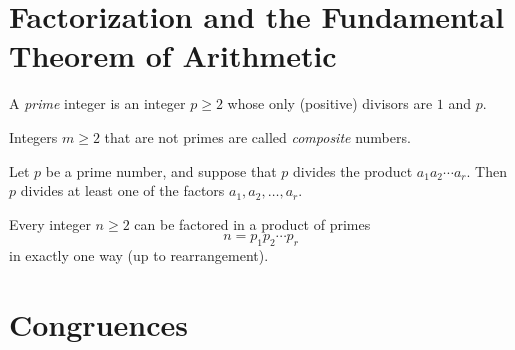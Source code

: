\documentclass[10pt]{article}
\begin{document}
\begin{comment}
\begin{lemma*} Let $a,b,c \in \Z$. If $\gcd(a,b,c)=1$, then $\gcd(\gcd(a,b),c)=1$.
\end{lemma*}

\begin{theorem*} Let $a,b,c \in \Z$. Then the equation
    \[ax+by+cz=1\]
    has solutions $(x,y,z) \in \Z^3$ if, and only if, $\gcd(a,b,c)=1$.
\end{theorem*}
\end{comment}

\section{Factorization and the Fundamental Theorem of Arithmetic}

\begin{definition*}[\textcolor{red}{Prime}] A \emph{prime} integer is an integer $p \geq 2$ whose only (positive) divisors are $1$ and $p$.
\end{definition*}


\begin{definition*}[\textcolor{red}{Composite}] Integers $m \geq 2$ that are not primes are called \emph{composite} numbers.
\end{definition*}

\begin{comment}
\begin{lemma} Let $p$ be a prime number, and suppose that $p$ divides the product $ab$. Then either $p$ divides $a$ or $p$ divides $b$ (or $p$ divides both $a$ and $b$).
\end{lemma}
\end{comment}

\setcounter{theorem}{1}
\begin{theorem}[\textcolor{red}{Prime Divisibility Property}] Let $p$ be a prime number, and suppose that $p$ divides the product $a_1a_2 \cdots a_r$. Then $p$ divides at least one of the factors $a_1,a_2,\ldots,a_r$.
\end{theorem}

\begin{theorem}[\textcolor{red}{The Fundamental Theorem of Arithmetic}] Every integer $n \geq 2$ can be factored in a product of primes
    \[n = p_1p_2 \cdots p_r\]
    in exactly one way (up to rearrangement).
\end{theorem}

\section{Congruences}
\end{document}
